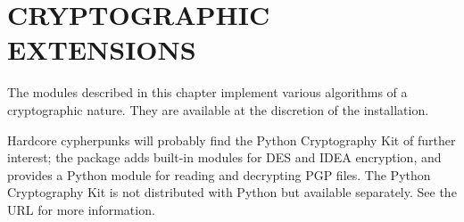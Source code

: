 \chapter{CRYPTOGRAPHIC EXTENSIONS}

The modules described in this chapter implement various algorithms of
a cryptographic nature.  They are available at the discretion of the
installation. 

Hardcore cypherpunks will probably find the Python Cryptography Kit of
further interest; the package adds built-in modules for DES and IDEA
encryption, and provides a Python module for reading and decrypting
PGP files.  The Python Cryptography Kit is not distributed with Python
but available separately.  See the URL
 for more information.
